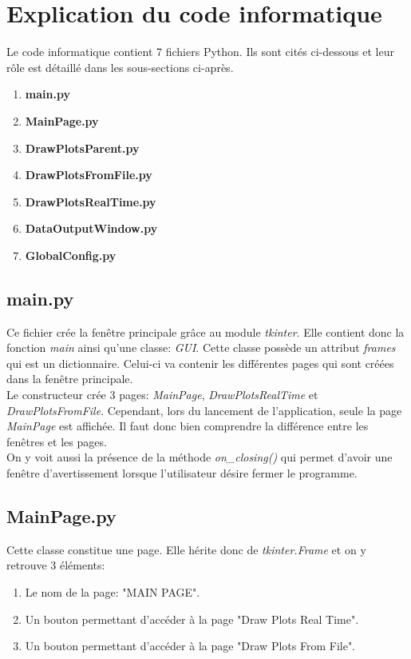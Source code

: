 \newpage
\section{Explication du code informatique}
\label{sec:explication_code}

Le code informatique contient 7 fichiers Python. Ils sont cités ci-dessous et leur rôle est détaillé dans les sous-sections ci-après.
\begin{enumerate}
    \item \textbf{main.py}
    \item \textbf{MainPage.py}
    \item \textbf{DrawPlotsParent.py}
    \item \textbf{DrawPlotsFromFile.py}
    \item \textbf{DrawPlotsRealTime.py}
    \item \textbf{DataOutputWindow.py}
    \item \textbf{GlobalConfig.py}
\end{enumerate}

\subsection{main.py}

Ce fichier crée la fenêtre principale grâce au module \textit{tkinter}. Elle contient donc la fonction \textit{main} ainsi qu'une classe: \textit{GUI}. Cette classe possède un attribut \textit{frames} qui est un dictionnaire. Celui-ci va contenir les différentes pages qui sont créées dans la fenêtre principale.\\

Le constructeur crée 3 pages: \textit{MainPage}, \textit{DrawPlotsRealTime} et \textit{DrawPlotsFromFile}. Cependant, lors du lancement de l'application, seule la page \textit{MainPage} est affichée. Il faut donc bien comprendre la différence entre les fenêtres et les pages.\\

On y voit aussi la présence de la méthode \textit{on\_closing()} qui permet d'avoir une fenêtre d'avertissement lorsque l'utilisateur désire fermer le programme.

\subsection{MainPage.py}

Cette classe constitue une page. Elle hérite donc de \textit{tkinter.Frame} et on y retrouve 3 éléments:
\begin{enumerate}
    \item Le nom de la page: "MAIN PAGE".
    \item Un bouton permettant d'accéder à la page "Draw Plots Real Time".
    \item Un bouton permettant d'accéder à la page "Draw Plots From File".\\
\end{enumerate}

